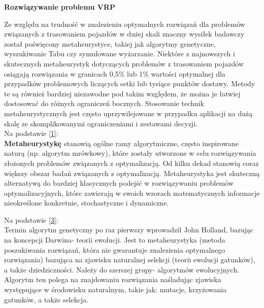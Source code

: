 \documentclass[a4paper, twoside, 12pt, justified]{article}
\begin{document}
	
	\begin{large}
		\begin{center}
			\textbf{Rozwiązywanie problemu VRP}
		\end{center}
	\end{large} 
	
	Ze względu na trudność w znalezieniu optymalnych rozwiązań dla problemów związanych z trasowaniem pojazdów w dużej skali znaczny wysiłek badawczy został poświęcony metaheurystyce, takiej jak algorytmy genetyczne, wyszukiwanie Tabu czy symulowane wyżarzanie. Niektóre z najnowszych i skutecznych metaheurystyk dotyczących problemów z trasowaniem pojazdów osiągają rozwiązania w granicach 0,5\% lub 1\% wartości optymalnej dla przypadków problemowych liczących setki lub tysiące punktów dostawy. Metody te są również bardziej niezawodne pod takim względem, że można je łatwiej dostosować do różnych ograniczeń bocznych. Stosowanie technik metaheurystycznych jest często uprzywilejowane w przypadku aplikacji na dużą skalę ze skomplikowanymi ograniczeniami i zestawami decyzji.\\
	
	Na podstawie \hyperlink{metaheurystyka}{[1]}:\\ 
	\textbf{Metaheurystykę} stanowią ogólne ramy algorytmiczne, często inspirowane naturą (np. algorytm mrówkowy), które zostały utworzone w celu rozwiązywania złożonych problemów związanych z optymalizacją. Od kilku dekad stanowią coraz większy obszar badań związanych z optymalizacją. Metaheurystyka jest skuteczną alternatywą
	do bardziej klasycznych podejść w rozwiązywaniu problemów optymalizacyjnych, które zawierają w swoich wzorach matematycznych informacje nieokreślone konkretnie, stochastyczne i dynamiczne.\\
	

	
	\newpage
	
	Na podstawie \hyperlink{ag}{[3]}:\\
	Termin algorytm genetyczny po raz pierwszy wprowadził John Holland, bazując na koncepcji Darwina- teorii ewolucji. Jest to metaheurystyka (metoda poszukiwania rozwiązań, która nie gwarantuje znalezienia optymalnego rozwiązania) bazująca na zjawisku naturalnej selekcji (teorii ewolucji gatunków), a także dziedziczności. Należy do szerszej grupy- algorytmów ewolucyjnych. Algorytm ten polega na znajdowaniu rozwiązania naśladując zjawiska występujące w środowisku naturalnym, takie jak: mutacje, krzyżowania gatunków, a także selekcja. \newpage
	
\end{document}
